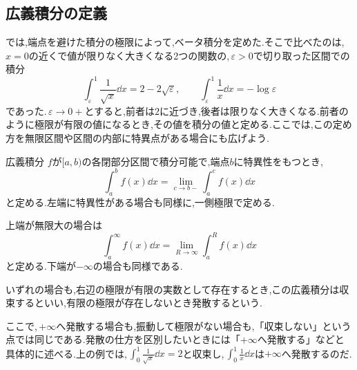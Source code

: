 \subsection{広義積分の定義}

では,端点を避けた積分の極限によって,ベータ積分を定めた.そこで比べたのは,\,$x=0$の近くで値が限りなく大きくなる2つの関数の,\,$\varepsilon>0$で切り取った区間での積分
\[
 \int_{\varepsilon}^1\frac1{\sqrt{x}}\dd x=2-2\sqrt{\varepsilon},\qquad
 \int_{\varepsilon}^1\frac1x\dd x=-\log\varepsilon
\]
であった.\,$\varepsilon\to0+$とすると,前者は$2$に近づき,後者は限りなく大きくなる.前者のように極限が有限の値になるとき,その値を積分の値と定める.ここでは,この定め方を無限区間や区間の内部に特異点がある場合にも広げよう.

\begin{definition}{広義積分}
$f$が$[a,b)$の各閉部分区間で積分可能で,端点$b$に特異性をもつとき,
\[
 \int_a^bf(x)\dd x=\lim_{c\to b-}\int_a^cf(x)\dd x
\]
と定める.左端に特異性がある場合も同様に,一側極限で定める.

上端が無限大の場合は
\[
 \int_a^{\infty}f(x)\dd x=\lim_{R\to\infty}\int_a^Rf(x)\dd x
\]
と定める.下端が$-\infty$の場合も同様である.

いずれの場合も,右辺の極限が有限の実数として存在するとき,この広義積分は収束するといい,有限の極限が存在しないとき発散するという.
\end{definition}

ここで,\,$+\infty$へ発散する場合も,振動して極限がない場合も,「収束しない」という点では同じである.発散の仕方を区別したいときには「$+\infty$へ発散する」などと具体的に述べる.上の例では,\,$\int_0^1\frac1{\sqrt{x}}\dd x=2$と収束し,\,$\int_0^1\frac1x\dd x$は$+\infty$へ発散するのだ.
